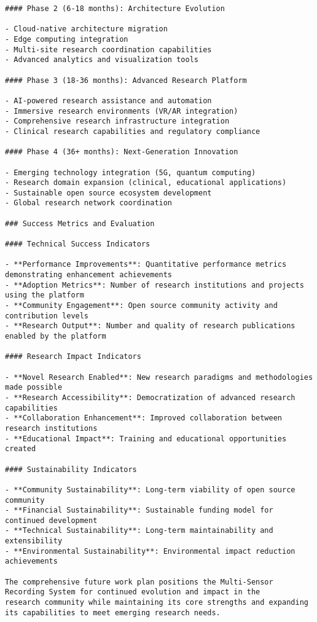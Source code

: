 \documentclass[12pt,a4paper]{report}
\begin{document}
\begin{verbatim}
#### Phase 2 (6-18 months): Architecture Evolution

- Cloud-native architecture migration
- Edge computing integration
- Multi-site research coordination capabilities
- Advanced analytics and visualization tools

#### Phase 3 (18-36 months): Advanced Research Platform

- AI-powered research assistance and automation
- Immersive research environments (VR/AR integration)
- Comprehensive research infrastructure integration
- Clinical research capabilities and regulatory compliance

#### Phase 4 (36+ months): Next-Generation Innovation

- Emerging technology integration (5G, quantum computing)
- Research domain expansion (clinical, educational applications)
- Sustainable open source ecosystem development
- Global research network coordination

### Success Metrics and Evaluation

#### Technical Success Indicators

- **Performance Improvements**: Quantitative performance metrics demonstrating enhancement achievements
- **Adoption Metrics**: Number of research institutions and projects using the platform
- **Community Engagement**: Open source community activity and contribution levels
- **Research Output**: Number and quality of research publications enabled by the platform

#### Research Impact Indicators

- **Novel Research Enabled**: New research paradigms and methodologies made possible
- **Research Accessibility**: Democratization of advanced research capabilities
- **Collaboration Enhancement**: Improved collaboration between research institutions
- **Educational Impact**: Training and educational opportunities created

#### Sustainability Indicators

- **Community Sustainability**: Long-term viability of open source community
- **Financial Sustainability**: Sustainable funding model for continued development
- **Technical Sustainability**: Long-term maintainability and extensibility
- **Environmental Sustainability**: Environmental impact reduction achievements

The comprehensive future work plan positions the Multi-Sensor Recording System for continued evolution and impact in the
research community while maintaining its core strengths and expanding its capabilities to meet emerging research needs.


\end{verbatim}
\end{document}
